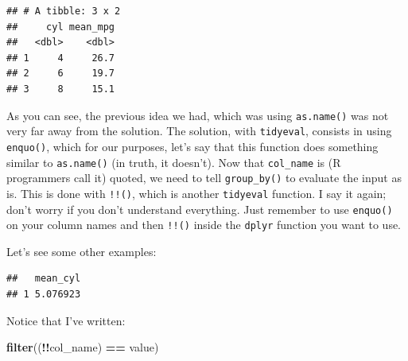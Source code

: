 \documentclass[]{gitbook}
\newenvironment{Shaded}{\begin{snugshade}}{\end{snugshade}}
\newcommand{\ControlFlowTok}[1]{\textcolor[rgb]{0.13,0.29,0.53}{\textbf{#1}}}
\newcommand{\DataTypeTok}[1]{\textcolor[rgb]{0.13,0.29,0.53}{#1}}
\newcommand{\DecValTok}[1]{\textcolor[rgb]{0.00,0.00,0.81}{#1}}
\newcommand{\KeywordTok}[1]{\textcolor[rgb]{0.13,0.29,0.53}{\textbf{#1}}}
\newcommand{\NormalTok}[1]{#1}
\newcommand{\OperatorTok}[1]{\textcolor[rgb]{0.81,0.36,0.00}{\textbf{#1}}}
\newcommand{\StringTok}[1]{\textcolor[rgb]{0.31,0.60,0.02}{#1}}
\begin{document}
\begin{verbatim}
## # A tibble: 3 x 2
##     cyl mean_mpg
##   <dbl>    <dbl>
## 1     4     26.7
## 2     6     19.7
## 3     8     15.1
\end{verbatim}

As you can see, the previous idea we had, which was using \texttt{as.name()} was not very far away from
the solution. The solution, with \texttt{tidyeval}, consists in using \texttt{enquo()}, which for our purposes,
let's say that this function does something similar to \texttt{as.name()} (in truth, it doesn't). Now that
\texttt{col\_name} is (R programmers call it) quoted, we need to tell \texttt{group\_by()} to evaluate the input as
is. This is done with \texttt{!!()}, which is another \texttt{tidyeval} function. I say it again;
don't worry if you don't understand everything. Just remember to use \texttt{enquo()} on your column names
and then \texttt{!!()} inside the \texttt{dplyr} function you want to use.

Let's see some other examples:

\begin{Shaded}
\end{Shaded}

\begin{verbatim}
##   mean_cyl
## 1 5.076923
\end{verbatim}

Notice that I've written:

\begin{Shaded}
\begin{Highlighting}[]
\KeywordTok{filter}\NormalTok{((}\OperatorTok{!!}\NormalTok{col_name) }\OperatorTok{==}\StringTok{ }\NormalTok{value)}
\end{Highlighting}
\end{Shaded}
\end{document}
